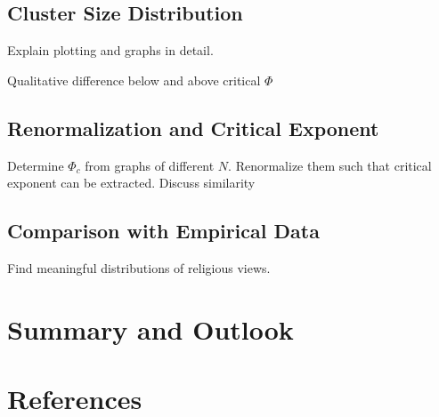 \documentclass[11pt]{article}
\begin{document}
\subsection{Cluster Size Distribution}

Explain plotting and graphs in detail.

Qualitative difference below and above critical $\Phi$

\subsection{Renormalization and Critical Exponent}

Determine $\Phi_c$ from graphs of different $N$. Renormalize them such that critical exponent can be extracted. Discuss similarity

\subsection{Comparison with Empirical Data}

Find meaningful distributions of religious views.

\section{Summary and Outlook}

\section{References}
\end{document}
